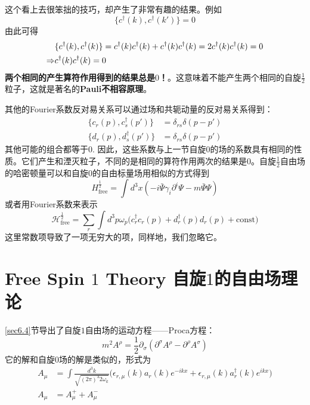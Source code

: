 这个看上去很笨拙的技巧，却产生了非常有趣的结果。例如
$$\{c^{\dagger}(k),c^{\dagger}(k') \}=0$$
由此可得
\begin{align}
	&\{ c^{\dagger}(k),c^{\dagger}(k) \}=c^{\dagger}(k)c^{\dagger}(k)+c^{\dagger}(k)c^{\dagger}(k)=2c^{\dagger}(k)c^{\dagger}(k)=0 \notag \\
	\Rightarrow &c^{\dagger}(k)c^{\dagger}(k)=0 \label{equ9.38}
\end{align}
{\bf 两个相同的产生算符作用得到的结果总是$0$！}。这意味着不能产生两个相同的自旋$\frac{1}{2}$粒子，这就是著名的{\bf Pauli不相容原理}。


其他的Fourier系数反对易关系可以通过场和共轭动量的反对易关系得到：
\begin{equation} \label{equ9.39}
\begin{split}
	\{c_{r}(p),c_{s}^{\dagger}(p') \} &= \delta_{rs}\delta(p-p') \\  
	\{d_{r}(p),d_{s}^{\dagger}(p') \} &= \delta_{rs}\delta(p-p') 
\end{split}
\end{equation}
其他可能的组合都等于$0$. 因此，这些系数与上一节自旋$0$的场的系数具有相同的性质。它们产生和湮灭粒子，不同的是相同的算符作用两次的结果是$0$。自旋$\frac{1}{2}$自由场的哈密顿量可以和自旋$0$的自由标量场用相似的方式得到
\begin{equation} \label{equ9.40}
	H^{\frac{1}{2}}_{\text{free}}=\int d^{3}x(-i\bar{\Psi}\gamma_{i}\partial^{i} \Psi-m\bar{\Psi}\Psi)
\end{equation}
或者用Fourier系数来表示
\begin{equation} \label{equ9.41}
	\mathscr{H}^{\frac{1}{2}}_{\text{free}} = \sum_{r}\int d^{3}p \omega_{p} \Big( c_{r}^{\dagger}c_{r}(p)+d^{\dagger}_{r}(p)d_{r}(p) + \text{const} \Big)
\end{equation}
这里常数项导致了一项无穷大的项，同样地，我们忽略它。

\section[自旋$1$的自由场理论]{Free Spin $1$ Theory \quad 自旋$1$的自由场理论}
\label{sec9.4}
\ref{sec6.4}节导出了自旋$1$自由场的运动方程——Proca方程：
\begin{equation} \label{equ9.42}
	m^{2}A^{\rho}=\frac{1}{2}\partial_{\sigma}(\partial^{\sigma}A^{\rho}-\partial^{\rho}A^{\sigma})
\end{equation}
它的解和自旋$0$场的解是类似的，形式为
\begin{align} 
	A_{\mu} &= \int \frac{d^{3}k}{ \sqrt{(2\pi)^{3}2\omega_{k}}}\Big( \epsilon_{r,\mu}(k) a_{r}(k)e^{-ikx}+\epsilon_{r,\mu}(k)a_{r}^{\dagger}(k)e^{ikx} \Big) \label{equ9.43} \\
	A_{\mu} &= A^{+}_{\mu}+A^{-}_{\mu} \label{equ9.44}
\end{align}

